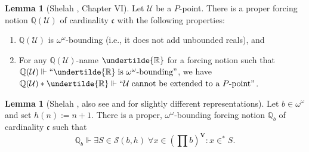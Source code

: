\documentclass[12pt]{article}
\theoremstyle{definition}
\newtheorem{lem}[nummer]{\sc Lemma}
\begin{document}
\begin{lem}[Shelah \cite{she}, Chapter VI]
Let $\mathcal{U}$ be a $P$-point. There is a proper forcing notion $\mathbb{Q}(\mathcal{U})$ of cardinality $\mathfrak{c}$ with the following properties:
\begin{enumerate}[label=(\roman*)]
    \item $\mathbb{Q}(\mathcal{U})$ is $\omega^\omega$-bounding (i.e., it does not add unbounded reals), and
    \item For any $\mathbb{Q}(\mathcal{U})$-name $\undertilde{\mathbb{R}}$ for a forcing notion such that $\mathbb{Q}(\mathcal{U})\Vdash ``\undertilde{\mathbb{R}} \;\text{is $\omega^\omega$-bounding}"$, we have $\mathbb{Q}(\mathcal{U})*\undertilde{\mathbb{R}}\Vdash ``\mathcal{U} \; \text{cannot be extended to a $P$-point}"$.
\end{enumerate}
\end{lem}
\begin{lem}[Shelah \cite{she-vive}, also see \cite{abraham2009proper} and \cite{laflamme-zap} for slightly different representations]
Let $b\in \omega^\omega$ and set $h(n):=n+1$. There is a proper, $\omega^\omega$-bounding forcing notion $\mathbb{Q}_b$ of cardinality $\mathfrak{c}$ such that
\begin{equation}\label{eq:genericslalom}
\mathbb{Q}_b\Vdash \exists S \in \mathcal{S}(b,h)\; \forall x \in \left(\prod b\right)^{\mathbf{V}}: x \in^{\ast}S. \tag{\textasteriskcentered}
\end{equation}
\end{lem}
\end{document}
